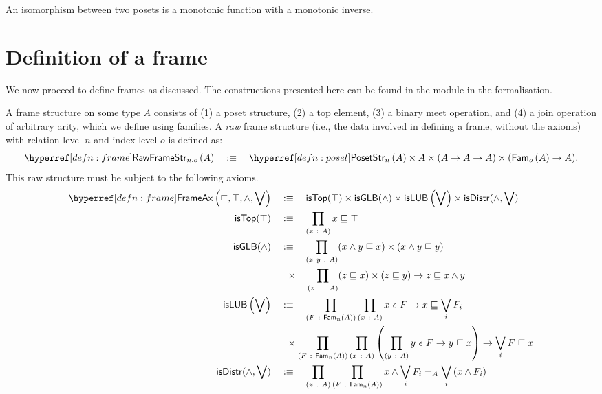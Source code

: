 \begin{defn}
  An isomorphism between two posets is a monotonic function with a monotonic inverse.
\end{defn}

\section{Definition of a frame}\label{sec:frame}

We now proceed to define frames as discussed. The constructions presented here can be
found in the  module in the \veragda{} formalisation.
\begin{defn}[Frame]\label{defn:frame}
  A frame structure on some type $A$ consists of (1) a poset structure, (2) a top element,
  (3) a binary meet operation, and (4) a join operation of arbitrary arity, which we
  define using families. A \emph{raw} frame structure (i.e., the data involved in defining
  a frame, without the axioms) with relation level $n$ and index level $o$ is defined as:
  \begin{equation*}
    \rawframestr{n}{o}{A} \quad\is\quad \posetstr{n}{A} \times A \times (A \rightarrow A \rightarrow A) \times (\sub{o}{A} \rightarrow A).
  \end{equation*}
  This raw structure must be subject to the following axioms.
  \begin{align*}
    \frameax{\sqsubseteq, \top, \wedge, \bigvee} \quad&\is\quad
      \mathsf{isTop}(\top) \times \mathsf{isGLB}(\wedge) \times \mathsf{isLUB}\left( \bigvee \right)
      \times \mathsf{isDistr}(\wedge, \bigvee)\\
    \mathsf{isTop}(\top) \quad&\is\quad \pity{x}{A}{x \sqsubseteq \top}\\
    \mathsf{isGLB}(\wedge) \quad&\is\quad \pity{x~y}{A}{(x \wedge y \sqsubseteq x) \times (x \wedge y \sqsubseteq y)}\\
                       &\hspace{0.55em}\times\quad \pity{z~~}{A}{(z \sqsubseteq x) \times (z \sqsubseteq y) \rightarrow z \sqsubseteq x \wedge y}\\
    \mathsf{isLUB}\left(\bigvee\right) \quad&\is\quad
         \pity{F}{\sub{n}{A}}{\pity{x}{A}{\memfam{x}{F} \rightarrow x \sqsubseteq \bigvee_i F_i}}\\
         &\hspace{0.55em}\times \pity{F}{\sub{n}{A}}{\pity{x}{A}{
               \left( \pity{y}{A}{\memfam{y}{F} \rightarrow y \sqsubseteq x}\right) \rightarrow \bigvee_i F \sqsubseteq x
             }}\\
    \mathsf{isDistr}(\wedge, \bigvee) \quad&\is\quad
      \pity{x}{A}{\pity{F}{\sub{n}{A}}{
          x \wedge \bigvee_i F_i} =_A \bigvee_i \left( x \wedge F_i \right)
      }
  \end{align*}
\end{defn}

